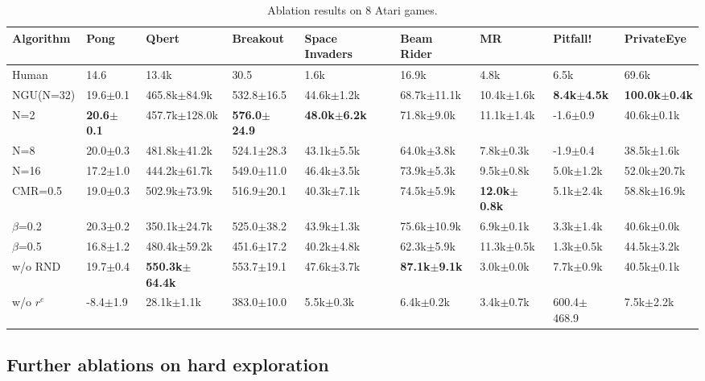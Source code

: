 \documentclass{article} %
\begin{document}
\begin{table}
\scriptsize
\centering
\begin{tabular}{m{1.5cm}|m{1.0cm}m{1.3cm}m{1cm}m{1cm}m{1.2cm}m{1cm}m{1cm}m{1cm}}
Algorithm & Pong & Qbert & Breakout & Space \phantom{-} Invaders & Beam Rider & MR & Pitfall! & PrivateEye \\ \hline
Human & 14.6 & 13.4k & 30.5 & 1.6k & 16.9k & 4.8k & 6.5k & 69.6k \\ \hline
NGU(N=32) & 19.6$\pm$0.1 & 465.8k$\pm$84.9k & 532.8$\pm$16.5 & 44.6k$\pm$1.2k & 68.7k$\pm$11.1k & 10.4k$\pm$1.6k & \textbf{8.4k$\pm$4.5k} & \textbf{100.0k$\pm$0.4k}\\
N=2 & \textbf{20.6$\pm$0.1} & 457.7k$\pm$128.0k & \textbf{576.0$\pm$24.9} & \textbf{48.0k$\pm$6.2k} & 71.8k$\pm$9.0k & 11.1k$\pm$1.4k & -1.6$\pm$0.9 & 40.6k$\pm$0.1k\\
N=8 & 20.0$\pm$0.3 & 481.8k$\pm$41.2k & 524.1$\pm$28.3 & 43.1k$\pm$5.5k & 64.0k$\pm$3.8k & 7.8k$\pm$0.3k & -1.9$\pm$0.4 & 38.5k$\pm$1.6k\\
N=16 & 17.2$\pm$1.0 & 444.2k$\pm$61.7k & 549.0$\pm$11.0 & 46.4k$\pm$3.5k & 73.9k$\pm$5.3k & 9.5k$\pm$0.8k & 5.0k$\pm$1.2k & 52.0k$\pm$20.7k\\
CMR=0.5 & 19.0$\pm$0.3 & 502.9k$\pm$73.9k & 516.9$\pm$20.1 & 40.3k$\pm$7.1k & 74.5k$\pm$5.9k & \textbf{12.0k$\pm$0.8k} & 5.1k$\pm$2.4k & 58.8k$\pm$16.9k\\
$\beta$=0.2 & 20.3$\pm$0.2 & 350.1k$\pm$24.7k & 525.0$\pm$38.2 & 43.9k$\pm$1.3k & 75.6k$\pm$10.9k & 6.9k$\pm$0.1k & 3.3k$\pm$1.4k & 40.6k$\pm$0.0k\\
$\beta$=0.5 & 16.8$\pm$1.2 & 480.4k$\pm$59.2k & 451.6$\pm$17.2 & 40.2k$\pm$4.8k & 62.3k$\pm$5.9k & 11.3k$\pm$0.5k & 1.3k$\pm$0.5k & 44.5k$\pm$3.2k\\
w/o RND & 19.7$\pm$0.4 & \textbf{550.3k$\pm$64.4k} & 553.7$\pm$19.1 & 47.6k$\pm$3.7k & \textbf{87.1k$\pm$9.1k} & 3.0k$\pm$0.0k & 7.7k$\pm$0.9k & 40.5k$\pm$0.1k\\
w/o $r^e$ & -8.4$\pm$1.9 & 28.1k$\pm$1.1k & 383.0$\pm$10.0 & 5.5k$\pm$0.3k & 6.4k$\pm$0.2k & 3.4k$\pm$0.7k & 600.4$\pm$468.9 & 7.5k$\pm$2.2k
\end{tabular}
\caption{Ablation results on 8 Atari games.}
\label{table_ablations}
\vspace{-4ex}
\end{table}

\subsection{Further ablations on hard exploration}
\end{document}
